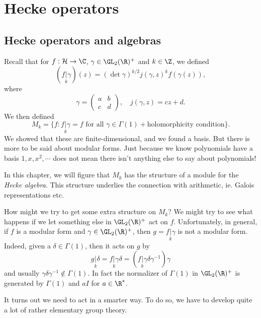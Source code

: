 \documentclass[a4paper]{article}
\renewcommand{\H}{\mathcal{H}}
\begin{document}
\section{Hecke operators}
\subsection{Hecke operators and algebras}
Recall that for $f: \H \to \C$, $\gamma \in \GL_2(\R)^+$ and $k \in \Z$, we defined
\[
  (f\underset{k}{|} \gamma)(z) = (\det \gamma)^{k/2} j(\gamma, z)^k f(\gamma(z)),
\]
where
\[
  \gamma =
  \begin{pmatrix}
    a & b\\
    c & d
  \end{pmatrix},\quad j(\gamma, z) = cz + d.
\]
We then defined
\[
  M_k = \{f: f \underset{k}{|} \gamma = f\text{ for all }\gamma \in \Gamma(1) + \text{holomorphicity condition}\}.
\]
We showed that these are finite-dimensional, and we found a basis. But there is more to be said about modular forms. Just because we know polynomials have a basis $1, x, x^2, \cdots$ does not mean there isn't anything else to say about polynomials!

In this chapter, we will figure that $M_k$ has the structure of a module for the \emph{Hecke algebra}. This structure underlies the connection with arithmetic, ie. Galois representations etc.

How might we try to get some extra structure on $M_k$? We might try to see what happens if we let something else in $\GL_2(\R)^+$ act on $f$. Unfortunately, in general, if $f$ is a modular form and $\gamma \in \GL_2(\R)^+$, then $g = f \underset{k}{|} \gamma$ is not a modular form. Indeed, given a $\delta\in \Gamma(1)$, then it acts on $g$ by
\[
  g\underset{k}{|} \delta = f\underset{k}{|} \gamma\delta = (f\underset{k}{|} \gamma \delta \gamma^{-1})\gamma
\]
and usually $\gamma \delta \gamma^{-1} \not \in \Gamma(1)$. In fact the normalizer of $\Gamma(1)$ in $\GL_2(\R)^+$ is generated by $\Gamma(1)$ and $aI$ for $a \in \R^*$.

It turns out we need to act in a smarter way. To do so, we have to develop quite a lot of rather elementary group theory.
\end{document}
